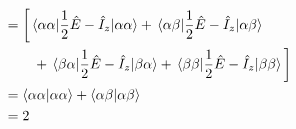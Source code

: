 \begin{appendixtext}
\begin{align*}
& \hspace{48pt}= \bigg[\mel{\alpha \alpha}{\frac{1}{2} \hat{E} - \hat{I}_z}{\alpha \alpha} + \mel{\alpha \beta}{\frac{1}{2} \hat{E} - \hat{I}_z}{\alpha \beta} \\
&\hspace{69pt} + \mel{\beta \alpha}{\frac{1}{2} \hat{E} - \hat{I}_z}{\beta \alpha} + \mel{\beta \beta}{\frac{1}{2} \hat{E} - \hat{I}_z}{\beta \beta} \bigg] \\
& \hspace{48pt}= \bra{\alpha \alpha} \ket{\alpha \alpha} + \bra{\alpha \beta} \ket{\alpha \beta} \\
& \hspace{48pt} = 2
\end{align*}

\begin{singlespacing}
\printappendixbibliography
\end{singlespacing}
\end{appendixtext}
